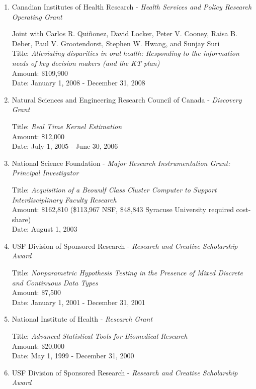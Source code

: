 \documentclass[
]{article}
\begin{document}
\begin{enumerate}
  Title: \emph{Kernel Estimation of a Conditional CDF with Mixed Data}\\
  Amount: \$108,630 (\$93,630 SSHRC, \$15,000 McMaster University
  matching funds)\\
  Date: July 1, 2005 - June 30, 2008
\item
  Canadian Institutes of Health Research - \emph{Health Services and
  Policy Research Operating Grant}

  Joint with Carlos R. Quiñonez, David Locker, Peter V. Cooney, Raisa B.
  Deber, Paul V. Grootendorst, Stephen W. Hwang, and Sunjay Suri\\
  Title: \emph{Alleviating disparities in oral health: Responding to the
  information needs of key decision makers (and the KT plan)}\\
  Amount: \$109,900\\
  Date: January 1, 2008 - December 31, 2008
\item
  Natural Sciences and Engineering Research Council of Canada -
  \emph{Discovery Grant}

  Title: \emph{Real Time Kernel Estimation}\\
  Amount: \$12,000\\
  Date: July 1, 2005 - June 30, 2006
\item
  National Science Foundation - \emph{Major Research Instrumentation
  Grant: Principal Investigator}

  Title: \emph{Acquisition of a Beowulf Class Cluster Computer to
  Support Interdisciplinary Faculty Research}\\
  Amount: \$162,810 (\$113,967 NSF, \$48,843 Syracuse University
  required cost-share)\\
  Date: August 1, 2003
\item
  USF Division of Sponsored Research - \emph{Research and Creative
  Scholarship Award}

  Title: \emph{Nonparametric Hypothesis Testing in the Presence of Mixed
  Discrete and Continuous Data Types}\\
  Amount: \$7,500\\
  Date: January 1, 2001 - December 31, 2001
\item
  National Institute of Health - \emph{Research Grant}

  Title: \emph{Advanced Statistical Tools for Biomedical Research}\\
  Amount: \$20,000\\
  Date: May 1, 1999 - December 31, 2000
\item
  USF Division of Sponsored Research - \emph{Research and Creative
  Scholarship Award}


\end{enumerate}
\end{document}
